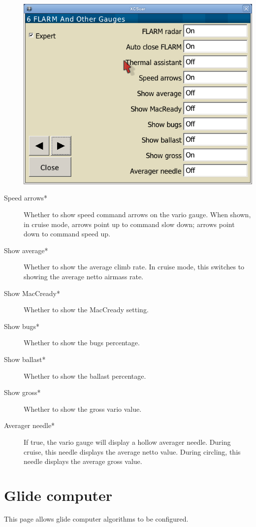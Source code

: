 \begin{description}
\begin{center}
\includegraphics[angle=0,width=0.8\linewidth,keepaspectratio='true']{figures/config-othergauges.png}
\end{center}
\label{conf:variogauge}
\item[Speed arrows*]  Whether to show speed command arrows on the vario gauge.
 When shown, in cruise mode, arrows point up to command slow down; arrows point down 
 to command speed up.
\item[Show average*]  Whether to show the average climb rate.  In cruise mode, this 
 switches to showing the average netto airmass rate.
\item[Show MacCready*]  Whether to show the MacCready setting.
\item[Show bugs*]  Whether to show the bugs percentage.
\item[Show ballast*]  Whether to show the ballast percentage.
\item[Show gross*]  Whether to show the gross vario value.
\item[Averager needle*]  If true, the vario gauge will display a hollow averager
 needle. During cruise, this needle displays the average netto value. During circling, 
 this needle displays the average gross value.
\end{description}


\clearpage
\section{Glide computer}\label{sec:final-glide}

This page allows glide computer algorithms to be configured.

